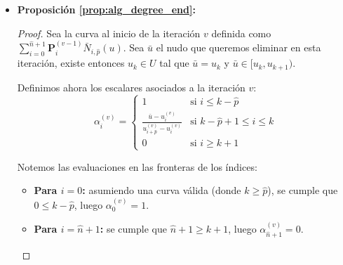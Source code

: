 \documentclass[11pt]{book}
\theoremstyle{plain} %
\theoremstyle{definition} %
\theoremstyle{definition} %
\begin{document}
\begin{itemize}
\begin{proof}
\begin{itemize}
\begin{align*}
                \end{align*}    
            \item \textbf{Segundo término:} $(1-u) B_{i,p}(u) = \binom{p}{i} u^i (1-u)^{p+1-i}$, multiplicamos y dividimos por $\frac{p+1}{p+1-i}$:
                \begin{align*}
                    &(1-u) B_{i,p}(u) = \frac{p+1-i}{p+1} \frac{(p+1)!}{i! (p+1-i)!} u^i (1-u)^{p+1-i}=\\
                    =&\frac{p+1-i}{p+1} \binom{p+1}{i} u^i (1-u)^{p+1-i} = \frac{p+1-i}{p+1} B_{i, p+1}(u).
                \end{align*}
        \end{itemize}
        Reensamblamos ahora las series y obtenemos:
        $$\sum_{i=0}^p \mathbf{P}_i \frac{i+1}{p+1} B_{i+1, p+1}(u) + \sum_{i=0}^p \mathbf{P}_i \frac{p+1-i}{p+1} B_{i, p+1}(u),$$
        realizamos el cambio de índice $j = i + 1$ a la primera serie:
        $$\sum_{j=1}^{p+1} \mathbf{P}_{j-1} \frac{j}{p+1} B_{j, p+1}(u) + \sum_{i=0}^p \mathbf{P}_i \left( 1 - \frac{i}{p+1} \right) B_{i, p+1}(u),$$
        notamos que para $j=0$, $\frac{j}{p+1}=0$ y para $i=p+1$, $\left( 1 - \frac{i}{p+1} \right)=0$, luego reescribimos de vuelta $j$ como $i$ y obtenemos la serie:
        $$\sum_{i=0}^{p+1} \left[ \frac{i}{p+1} \mathbf{P}_{i-1} + \left(1 - \frac{i}{p+1}\right) \mathbf{P}_i \right] B_{i, p+1}(u).$$
    \end{proof}
    \item \textbf{Proposición \ref{prop:alg_degree_end}:}
    \begin{proof}
        Sea la curva al inicio de la iteración $v$ definida como $\sum_{i=0}^{\hat{n}+1} \mathbf{P}^{(v-1)}_i \bar{N}_{i,\hat{p}}(u)$. Sea $\bar{u}$ el nudo que queremos eliminar en esta iteración, existe entonces $u_k \in U$ tal que $\bar{u}=u_k$ y $\bar{u} \in [u_k, u_{k+1})$.

        Definimos ahora los escalares asociados a la iteración $v$:
        $$\alpha_i^{(v)} = \begin{cases} 1 & \text{si } i \le k-\hat{p} \\ \frac{\bar{u} - u_i^{(v)}}{u_{i+\hat{p}}^{(v)} - u_i^{(v)}} & \text{si } k-\hat{p}+1 \le i \le k \\ 0 & \text{si } i \ge k+1 \end{cases}$$
        
        Notemos las evaluaciones en las fronteras de los índices:
        \begin{itemize}
            \item \textbf{Para $i=0$:} asumiendo una curva válida (donde $k \ge \hat{p}$), se cumple que $0 \le k-\hat{p}$, luego $\alpha_0^{(v)}=1$.
            \item \textbf{Para $i=\hat{n}+1$:} se cumple que $\hat{n}+1 \ge k+1$, luego $\alpha_{\hat{n}+1}^{(v)}=0$.
        \end{itemize}


\end{proof}
\end{itemize}
\end{document}
